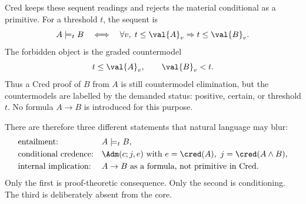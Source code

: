 Cred keeps these sequent readings and rejects the material conditional
as a primitive.  For a threshold $t$, the sequent is
\[
  A\models_t B
  \quad\Longleftrightarrow\quad
  \forall v,\; t\le \val{A}_v \Rightarrow t\le \val{B}_v.
\]
The forbidden object is the graded countermodel
\[
  t\le \val{A}_v,
  \qquad
  \val{B}_v<t.
\]
Thus a Cred proof of $B$ from $A$ is still countermodel elimination,
but the countermodels are labelled by the demanded status: positive,
certain, or threshold $t$.  No formula $A\to B$ is introduced for this
purpose.

There are therefore three different statements that natural language
may blur:
\[
\begin{array}{ll}
\text{entailment:} & A\models_t B,\\[1mm]
\text{conditional credence:} & \Adm(c;j,e)\text{ with }e=\cred(A),\ j=\cred(A\land B),\\[1mm]
\text{internal implication:} & A\to B\text{ as a formula, not primitive in Cred.}
\end{array}
\]
Only the first is proof-theoretic consequence.  Only the second is
conditioning.  The third is deliberately absent from the core.

